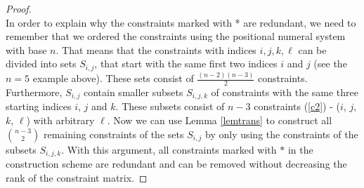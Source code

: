 \begin{proof}
 \\

In order to explain why the constraints marked with * are redundant, we need to remember that we ordered the constraints using the positional numeral system with base $n$. That means that the constraints with indices $i,j,k,\ell$ can be divided into sets $S_{i,j}$, that start with the same first two indices $i$ and $j$ (see the $n=5$ example above). These sets consist of $\frac{(n-2)(n-3)}{2}$ constraints.
Furthermore, $S_{i,j}$ contain smaller subsets $S_{i,j,k}$ of constraints with the same three starting indices $i$, $j$ and $k$. These subsets consist of $n-3$ constraints (\ref{c2}) - ($i$, $j$, $k$, $\ell$) with arbitrary $\ell$. Now we can use Lemma \ref{lemtrans} to construct all $\binom{n-3}{2}$ remaining constraints of the sets $S_{i,j}$ by only using the constraints of the subsets $S_{i,j,k}$. With this argument, all constraints marked with $*$ in the construction scheme are redundant and can be removed without decreasing the rank of the constraint matrix.
	

\end{proof}
